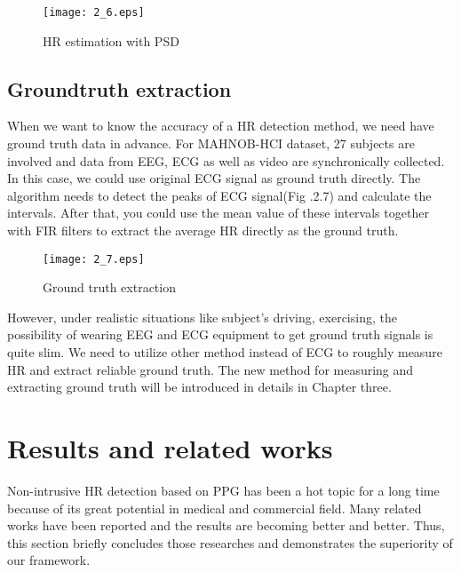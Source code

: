 \begin{figure}[ht]
\centering
\texttt{[image: 2\_6.eps]}
\caption{HR estimation with PSD}\label{fig:noted-figure}
\end{figure}

\subsection{Groundtruth extraction}
When we want to know the accuracy of a HR detection method, we need have ground truth data in advance. For MAHNOB-HCI dataset\cite{soleymani2012multimodal}, 27 subjects are involved and data from EEG, ECG as well as video are synchronically collected. In this case, we could use original ECG signal as ground truth directly. The algorithm needs to detect the peaks of ECG signal(Fig .2.7) and calculate the intervals. After that, you could use the mean value of these intervals together with FIR filters to extract the average HR directly as the ground truth.

\begin{figure}[ht]
\centering
\texttt{[image: 2\_7.eps]}
\caption{Ground truth extraction}\label{fig:noted-figure}
\end{figure}

However, under realistic situations like subject's driving, exercising, the possibility of wearing EEG and ECG equipment to get ground truth signals is quite slim. We need to utilize other method instead of ECG to roughly measure HR and extract reliable ground truth. The new method for measuring and extracting ground truth will be introduced in details in Chapter three. 

\section{Results and related works}
Non-intrusive HR detection based on PPG has been a hot topic for a long time because of its great potential in medical and commercial field. Many related works have been reported and the results are becoming better and better. Thus, this section briefly concludes those researches and demonstrates the superiority of our framework.

